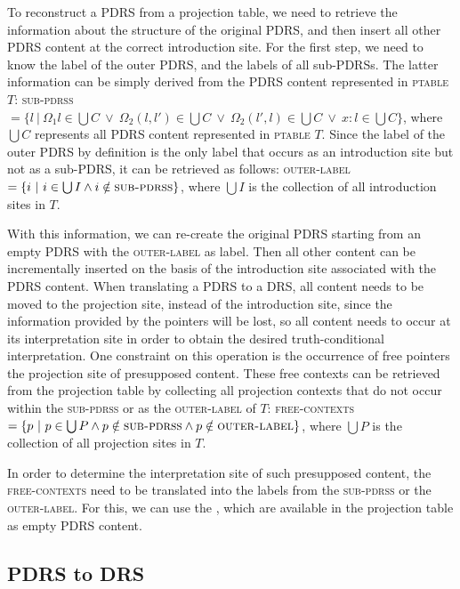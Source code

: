 To reconstruct a PDRS from a projection table, we need to
retrieve the information about the structure of the original PDRS,
and then insert all other PDRS content at the correct introduction site. For
the first step, we need to know the label of the outer PDRS, and the labels
of all sub-PDRSs. The latter information can be simply derived from the PDRS
content represented in \textsc{ptable} $T$: \textsc{sub-pdrss} $=\{l~|~\Omega_1
  l \in \bigcup C ~\vee~ \Omega_2(l,l') \in \bigcup C ~\vee~ \Omega_2(l',l) \in
\bigcup C ~\vee~ x:l \in \bigcup C \}$, where $\bigcup C$ represents all
PDRS content represented in \textsc{ptable} $T$. Since the label of the
outer PDRS by definition is the only label that occurs as an introduction
site but not as a sub-PDRS, it can be retrieved as follows:
\textsc{outer-label} $=\{i~|~i\in\bigcup I \wedge i \notin
\textsc{sub-pdrss}\}$, where $\bigcup I$ is the collection of all
introduction sites in $T$.

With this information, we can re-create the original PDRS starting from an
empty PDRS with the \textsc{outer-label} as label. Then all other content
can be incrementally inserted on the basis of the introduction site
associated with the PDRS content. When translating a PDRS to a DRS, all
content needs to be moved to the projection site, instead of the
introduction site, since the information provided by the pointers will be
lost, so all content needs to occur at its interpretation site in order to
obtain the desired truth-conditional interpretation. One constraint on this
operation is the occurrence of free pointers the projection site of
presupposed content. These free contexts can be retrieved from the
projection table by collecting all projection contexts that do not occur
within the \textsc{sub-pdrss} or as the \textsc{outer-label} of $T$:
\textsc{free-contexts} $=\{p~|~p\in\bigcup P \wedge p \notin
\textsc{sub-pdrss} \wedge p \notin \textsc{outer-label}\}$, where $\bigcup
P$ is the collection of all projection sites in $T$.

In order to determine the interpretation site of such presupposed content,
the \textsc{free-contexts} need to be translated into the labels from the
\textsc{sub-pdrss} or the \textsc{outer-label}. For this, we can use the
\MAPs, which are available in the projection table as empty PDRS content.

\subsection{PDRS to DRS}

